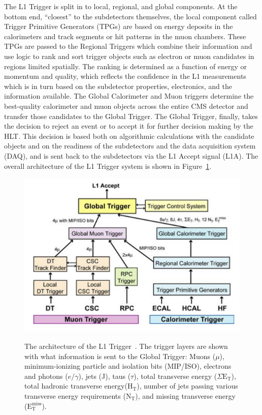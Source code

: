 The L1 Trigger is split in to local, regional, and global components.  At the bottom end, ``closest'' to the subdetectors themselves, the local component called Trigger Primitive Generators (TPGs) are based on energy deposits in the calorimeters and track segments or hit patterns in the muon chambers.  These TPGs are passed to the Regional Triggers which combine their information and use logic to rank and sort trigger objects such as electron or muon candidates in regions limited spatially.  The ranking is determined as a function of energy or momentum and quality, which reflects the confidence in the L1 measurements which is in turn based on the subdetector properties, electronics, and the information available.  The Global Calorimeter and Muon triggers determine the best-quality calorimeter and muon objects across the entire CMS detector and transfer those candidates to the Global Trigger.  The Global Trigger, finally, takes the decision to reject an event or to accept it for further decision making by the HLT.  This decision is based both on algorithmic calculations with the candidate objects and on the readiness of the subdetectors and the data acquisition system (DAQ), and is sent back to the subdetectors via the L1 Accept signal (L1A).  The overall architecture of the L1 Trigger system is shown in Figure~\ref{figapp:L1Tarchitecture}.  

\begin{figure}[!Hh]
       \includegraphics[scale=0.7]{Figures/L1Tarchitecture.png} \\
       \caption[Architecture of the Level-1 Trigger.]{The architecture of the L1 Trigger~\cite{CMSdetector}.  The trigger layers are shown with what information is sent to the Global Trigger: Muons ($\mu$), minimum-ionizing particle and isolation bits (MIP/ISO), electrons and photons ($e/\gamma$), jets (J), taus ($\tau$), total transverse energy ($\Sigma \text{E}_\text{T}$), total hadronic transverse energy($\text{H}_\text{T}$), number of jets passing various transverse energy requirements ($\text{N}_\text{T}$), and missing transverse energy ($\text{E}^\text{miss}_\text{T}$).}
\label{figapp:L1Tarchitecture}
\end{figure}

